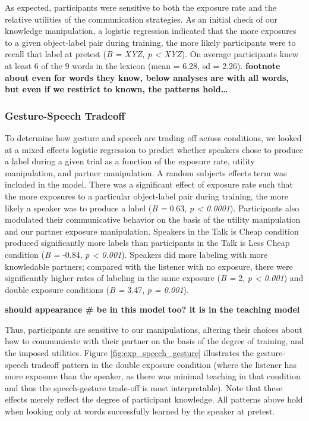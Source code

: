 \documentclass[10pt, letterpaper]{article}
\begin{document}
As expected, participants were sensitive to both the exposure rate and
the relative utilities of the communication strategies. As an initial
check of our knowledge manipulation, a logistic regression indicated
that the more exposures to a given object-label pair during training,
the more likely participants were to recall that label at pretest
(\emph{B = XYZ, p \textless{} XYZ}). On average participants knew at
least 6 of the 9 words in the lexicon (mean = 6.28, sd = 2.26).
\textbf{footnote about even for words they know, below analyses are with
all words, but even if we restirict to known, the patterns hold\ldots{}}

\hypertarget{gesture-speech-tradeoff}{%
\subsubsection{Gesture-Speech Tradeoff}\label{gesture-speech-tradeoff}}

To determine how gesture and speech are trading off across conditions,
we looked at a mixed effects logistic regression to predict whether
speakers chose to produce a label during a given trial as a function of
the exposure rate, utility manipulation, and partner manipulation. A
random subjects effects term was included in the model. There was a
significant effect of exposure rate such that the more exposures to a
particular object-label pair during training, the more likely a speaker
was to produce a label (\emph{B =} 0.63, \emph{p \textless{} 0.0001}).
Participants also modulated their communicative behavior on the basis of
the utility manipulation and our partner exposure manipulation. Speakers
in the Talk is Cheap condition produced significantly more labels than
participants in the Talk is Less Cheap condition (\emph{B =} -0.84,
\emph{p \textless{} 0.001}). Speakers did more labeling with more
knowledable partners; compared with the listener with no exposure, there
were significantly higher rates of labeling in the same exposure
(\emph{B =} 2, \emph{p \textless{} 0.001}) and double exposure
conditions (\emph{B =} 3.47, \emph{p = 0.001}).

\textbf{should appearance \# be in this model too? it is in the teaching
model}

Thus, participants are sensitive to our manipulations, altering their
choices about how to communicate with their partner on the basis of the
degree of training, and the imposed utilities. Figure
\ref{fig:exp_speech_gesture} illustrates the gesture-speech tradeoff
pattern in the double exposure condition (where the listener has more
exposure than the speaker, as there was minimal teaching in that
condition and thus the speech-gesture trade-off is most interpretable).
Note that these effects merely reflect the degree of participant
knowledge. All patterns above hold when looking only at words
successfully learned by the speaker at pretest.
\end{document}
